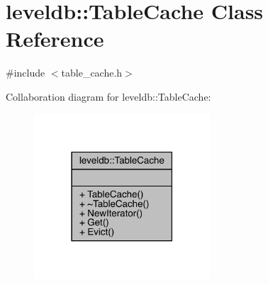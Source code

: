 \hypertarget{classleveldb_1_1_table_cache}{}\section{leveldb\+::Table\+Cache Class Reference}
\label{classleveldb_1_1_table_cache}


{\ttfamily \#include $<$table\+\_\+cache.\+h$>$}



Collaboration diagram for leveldb\+::Table\+Cache\+:
\nopagebreak
\begin{figure}[H]
\begin{center}
\leavevmode
\includegraphics[width=186pt]{classleveldb_1_1_table_cache__coll__graph}
\end{center}
\end{figure}
